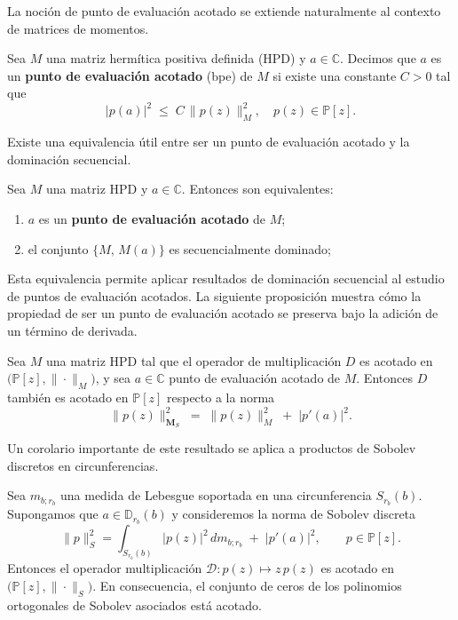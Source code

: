 La noción de punto de evaluación acotado se extiende naturalmente al contexto de matrices de momentos.

\begin{definition}\label{def:bounded_eval_point_matrix}
	\cite{escribano2025zeros} Sea $M$ una matriz hermítica positiva definida (HPD) y $a\in\mathbb{C}$.
	Decimos que $a$ es un \textbf{punto de evaluación acotado} (bpe) de $M$ si existe una constante $C>0$ tal que
	\[ |p(a)|^{2}\;\le\;C\,\|p(z)\|_{M}^{2}, \quad p(z)\in\mathbb{P}[z]. \]
\end{definition}

Existe una equivalencia útil entre ser un punto de evaluación acotado y la dominación secuencial.

\begin{proposition}\label{prop:equiv_bounded_eval_point}
	\cite{escribano2025zeros} Sea $M$ una matriz HPD y $a\in\mathbb{C}$. Entonces son equivalentes:
	\begin{enumerate}
		\item $a$ es un \textbf{punto de evaluación acotado} de $M$;
		\item el conjunto $\{M,\,M(a)\}$ es secuencialmente dominado;
	\end{enumerate}
\end{proposition}

Esta equivalencia permite aplicar resultados de dominación secuencial al estudio de puntos de evaluación acotados. La siguiente proposición muestra cómo la propiedad de ser un punto de evaluación acotado se preserva bajo la adición de un término de derivada.

\begin{proposition}\label{prop:bounded_derivative_eval}
	\cite{escribano2025zeros} Sea $M$ una matriz HPD tal que el operador de multiplicación $D$
	es acotado en $\bigl(\mathbb{P}[z],\|\cdot\|_{M}\bigr)$, y sea $a\in\mathbb{C}$ punto de evaluación acotado de $M$.
	Entonces $D$ también es acotado en $\mathbb{P}[z]$ respecto a la norma
	\[
		\|p(z)\|_{\textbf{M}_{S}}^{2}\;=\;\|p(z)\|_{M}^{2}\;+\;
		\bigl|p'(a)\bigr|^{2}.
	\]
\end{proposition}

Un corolario importante de este resultado se aplica a productos de Sobolev discretos en circunferencias.

\begin{corollary}\label{cor:bounded_zeros_circle}
	\cite{escribano2025zeros}
	Sea $m_{b;r_b}$ una medida de Lebesgue soportada en una circunferencia $S_{r_b}(b)$.
	Supongamos que $a\in \mathbb{D}_{r_b}(b)$ y consideremos la norma de Sobolev discreta
	\[
		\|p\|_{S}^{2}= \int_{S_{r_b}(b)} |p(z)|^{2}\,dm_{b;r_b}\;+\;\bigl|p'(a)\bigr|^{2},
		\qquad p\in\mathbb{P}[z].
	\]
	Entonces el operador multiplicación $\mathcal{D}\colon p(z)\mapsto z\,p(z)$
	es acotado en $\bigl(\mathbb{P}[z],\|\cdot\|_{S}\bigr)$.
	En consecuencia, el conjunto de ceros de los polinomios ortogonales de Sobolev asociados está acotado.
\end{corollary}

